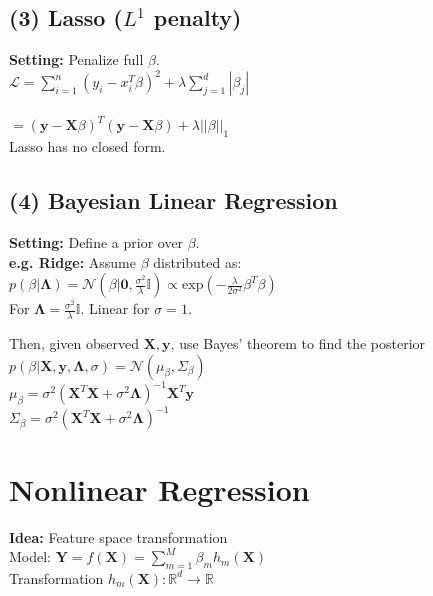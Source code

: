 \subsection*{(3) Lasso ($L^1$ penalty)}
\textbf{Setting:} Penalize full $\beta$.\\
$\mathcal{L} = \sum_{i=1}^n(y_i-x_i^T\beta)^2+\lambda\sum_{j=1}^d|\beta_j| $\\\\
$=(\mathbf{y}-\mathbf{X}\beta)^T(\mathbf{y}-\mathbf{X}\beta)+\lambda||\beta||_1$\\
Lasso has no closed form.

\subsection*{(4) Bayesian Linear Regression}
\textbf{Setting:} Define a prior over $\beta$.\\
\textbf{e.g. Ridge:} Assume $\beta$ distributed as:\\
$p(\beta|\bm{\bm{\Lambda}}){=}\mathcal{N}(\beta|\mathbf{0},\frac{\sigma^2}{\lambda}\mathbb{I}) \propto \mathrm{exp}(-\frac{\lambda}{2\sigma^2}\beta^T\beta)$\\
For $\bm{\Lambda}=\frac{\sigma^2}{\lambda}\mathbb{I}$. Linear for $\sigma=1$.

Then, given observed $\mathbf{X},\mathbf{y}$, use Bayes' theorem to find the posterior\\
$p(\beta|\mathbf{X},\mathbf{y}, \bm{\Lambda}, \sigma) = \mathcal{N}(\mu_{\beta}, \Sigma_{\beta})$\\
$\mu_\beta = \sigma^2(\mathbf{X}^T\mathbf{X} +\sigma^2\bm{\Lambda})^{-1}\mathbf{X}^T\mathbf{y}$\\
$\Sigma_\beta = \sigma^2(\mathbf{X}^T\mathbf{X} +\sigma^2\bm{\Lambda})^{-1}$

\section*{Nonlinear Regression}
\textbf{Idea:} Feature space transformation\\
Model: $\mathbf{Y}=f(\mathbf{X})=\sum_{m=1}^M\beta_m h_m(\mathbf{X})$\\
Transformation $h_m(\mathbf{X}):\mathbb{R}^d \rightarrow \mathbb{R}$



